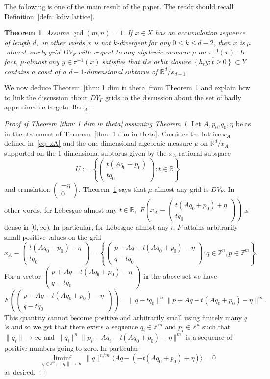 \documentclass[reqno,11pt, twoside]{amsart}
\theoremstyle{plain}
\newtheorem{thm}{Theorem}[section]
\theoremstyle{definition}
\theoremstyle{definition}
\theoremstyle{remark}
\numberwithin{equation}{section}
\newcommand{\bR}{\mathbb{R}}
\newcommand{\bZ}{\mathbb{Z}}
\newcommand\norm[1]{\|#1\|}
\newcommand\seta[1]{\left\{#1\right\}}
\newcommand\pa[1]{\left(#1\right)}
\newcommand\idist[1]{\langle#1\rangle}
\newcommand\on[1]{\operatorname{#1}}
\newcommand\mat[1]{\pa{\begin{matrix}#1\end{matrix}}}
\begin{document}
The following is one of the main result of the paper. The readr should recall Definition~\ref{defn: kdiv lattice}.
\begin{thm}\label{thm: main theorem F formulation}
    Assume $\gcd(m,n)=1$. 
    If $x\in X$ has an accumulation sequence of length $d,$
    in other words $x$ is not $k$-divergent for any $0\le k\le d-2$, then 
    $x$ is $\mu$-almost surely grid $DV_F$
    with respect to any algebraic measure $\mu$ on $\pi^{-1}(x)$. In fact, $\mu$-almost any $y\in \pi^{-1}(x)$ satisfies that the orbit closure $\overline{\seta{h_ty:t\ge 0}}\subset Y$ contains a coset of a $d-1$-dimensional subtorus of $\bR^d/x_{d-1}$. 
\end{thm}
We now deduce Theorem~\ref{thm: 1 dim in theta} from Theorem~\ref{thm: main theorem F formulation} and explain how to link the discussion about $DV_F$ grids to the discussion about the set of badly approximable targets $\on{Bad}_A$.
\begin{proof}[Proof of Theorem \ref{thm: 1 dim in theta} assuming Theorem
\ref{thm: main theorem F formulation}]
    Let $A,p_0,q_0, \eta$ be as in the statement of Theorem~\ref{thm: 1 dim in theta}. 
    Consider the lattice $x_A$ defined in~\eqref{eq: xA} and the one dimensional algebraic measure
    $\mu$ on $\bR^d/x_A$ supported on the 1-dimensional subtorus 
    given by the $x_A$-rational subspace
    $$U:= \seta{\mat{t(Aq_0+p_0)\\tq_0} :t\in \bR}$$
    and translation $\mat{-\eta\\ 0}.$ 
    Theorem~\ref{thm: main theorem F formulation} says that $\mu$-almost any grid is $DV_F$. In other words, for Lebesgue almost any $t\in \bR,$
    $F(x_A- \mat{t(Aq_0+p_0)+\eta\\tq_0})$ is dense in $[0,\infty).$
    In particular, for Lebesgue almost any $t$, 
    $F$ attains arbitrarily small positive values on the grid 
    $$x_A- \mat{t(Aq_0+p_0)+\eta\\tq_0}=\seta{\mat{p+Aq-t(Aq_0+p_0)-\eta\\ q-tq_0}: q\in\bZ^n, p\in \bZ^m}.$$
    For a vector $\mat{p+Aq-t(Aq_0+p_0)-\eta\\ q-tq_0}$ in the above set we have 
    $$F(\mat{p+Aq-t(Aq_0+p_0)-\eta\\ q-tq_0}) = \norm{q-tq_0}^n
    \norm{p+Aq-t(Aq_0+p_0)-\eta}^m.$$
    This quantity cannot become positive and arbitrarily small using finitely many $q$'s and so we get that there exists a sequence $q_i\in \bZ^m$ and 
    $p_i\in \bZ^n$ such that $\norm{q_i}\to\infty$ and 
    $\norm{q_i}^n\norm{p_i+Aq_i-t(Aq_0+p_0)-\eta}^m $ is a sequence of positive numbers going to zero. In particular
    $$\liminf_{q\in \bZ^n,\norm{q}\to\infty}\norm{q}^{n/m}\idist{Aq-(-t(Aq_0+p_0)+\eta)} = 0$$ 
    as desired.
   
\end{proof}
\end{document}

